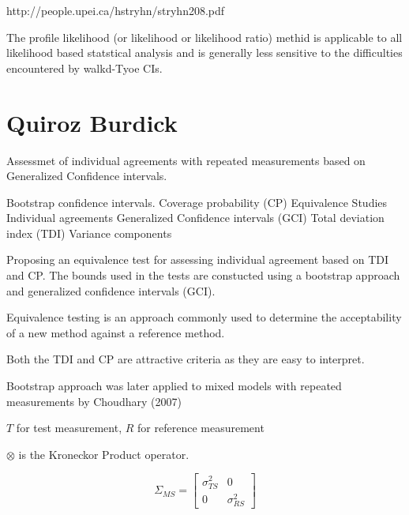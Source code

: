\documentclass[]{article}
\begin{document}

http://people.upei.ca/hstryhn/stryhn208.pdf

The profile likelihood (or likelihood or likelihood ratio) methid is applicable to 
all likelihood based statstical analysis and is generally less sensitive to the difficulties
encountered by walkd-Tyoe CIs.
  
\section{Quiroz Burdick}
Assessmet of individual agreements with repeated measurements based on Generalized Confidence intervals.


Bootstrap confidence intervals.
Coverage probability (CP)
Equivalence Studies
Individual agreements
Generalized Confidence intervals (GCI)
Total deviation index (TDI)
Variance components

Proposing an equivalence test for assessing individual agreement based on TDI and CP.
The bounds used in the tests are constucted using a bootstrap approach and generalized confidence intervals (GCI).


Equivalence testing is an approach commonly used to determine the acceptability of a new method 
against a reference method.


Both the TDI and CP are attractive criteria as they are easy to interpret.

Bootstrap approach was later applied to mixed models with repeated measurements by Choudhary (2007)

$T$ for test measurement, $R$ for reference measurement


$\otimes$ is the Kroneckor Product operator.

\[  \Sigma_{MS} =  \left[     \begin{array}{cc} \sigma^2_{TS} & 0 \\ 0 & \sigma^2_{RS} \end{array}\right] \]
\end{document}
